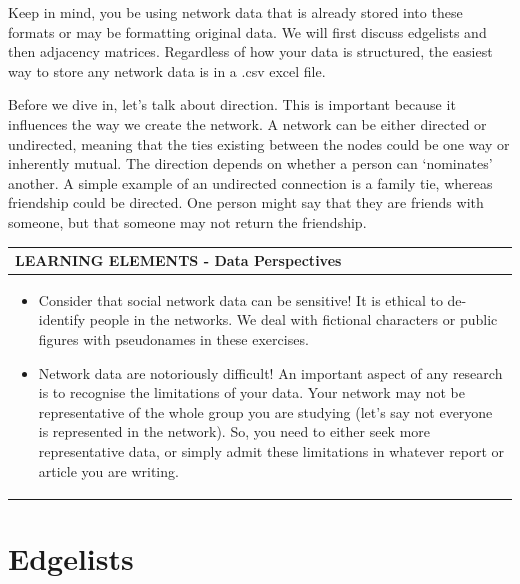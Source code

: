 \documentclass[
  letterpaper,
  DIV=11,
  numbers=noendperiod]{scrreprt}
\begin{document}
Keep in mind, you be using network data that is already stored into
these formats or may be formatting original data. We will first discuss
edgelists and then adjacency matrices. Regardless of how your data is
structured, the easiest way to store any network data is in a .csv excel
file.

Before we dive in, let's talk about direction. This is important because
it influences the way we create the network. A network can be either
directed or undirected, meaning that the ties existing between the nodes
could be one way or inherently mutual. The direction depends on whether
a person can `nominates' another. A simple example of an undirected
connection is a family tie, whereas friendship could be directed. One
person might say that they are friends with someone, but that someone
may not return the friendship.

\begin{longtable}[]{@{}
  >{\raggedright\arraybackslash}p{}@{}}
\toprule\noalign{}
\begin{minipage}[b]{\linewidth}\raggedright
LEARNING ELEMENTS - Data Perspectives
\end{minipage} \\
\midrule\noalign{}
\endhead
\bottomrule\noalign{}
\endlastfoot
\begin{minipage}[t]{\linewidth}\raggedright
\begin{itemize}
\item
  Consider that social network data can be sensitive! It is ethical to
  de-identify people in the networks. We deal with fictional characters
  or public figures with pseudonames in these exercises.
\item
  Network data are notoriously difficult! An important aspect of any
  research is to recognise the limitations of your data. Your network
  may not be representative of the whole group you are studying (let's
  say not everyone is represented in the network). So, you need to
  either seek more representative data, or simply admit these
  limitations in whatever report or article you are writing.
\end{itemize}
\end{minipage} \\
\end{longtable}

\section{Edgelists}\label{edgelists}
\end{document}

